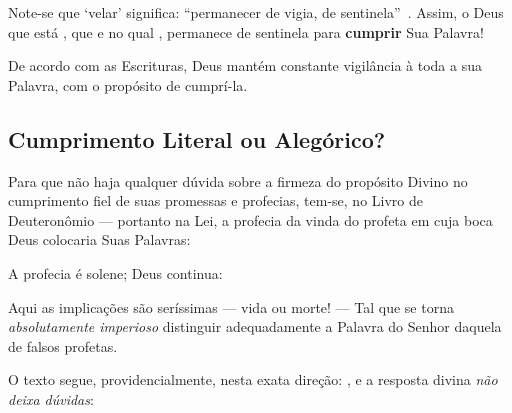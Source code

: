     Note-se que `velar' significa: ``permanecer de vigia, de sentinela''~\cite{2009-Houaiss+Franco-Objetiva}. Assim, o Deus  que
    está ,  que   e no qual , permanece de sentinela para \textbf{cumprir} Sua Palavra!

    \begin{PRI}
        \label{pri.vigilância}
        De acordo com as Escrituras, Deus mantém constante vigilância à toda a  sua  Palavra,  com  o  propósito  de
        cumprí-la.
    \end{PRI}


    \subsection{Cumprimento Literal ou Alegórico?}

    Para que não haja qualquer dúvida sobre a firmeza do propósito Divino no cumprimento fiel de  suas  promessas  e  profecias,
    tem-se, no Livro de Deuteronômio --- portanto na Lei, a profecia da vinda do  profeta  em  cuja  boca  Deus  colocaria  Suas
    Palavras:


    A profecia é solene; Deus continua:


    Aqui as implicações são seríssimas --- vida ou morte!  ---  Tal  que  se  torna  \emph{absolutamente  imperioso}  distinguir
    adequadamente a Palavra do Senhor daquela de falsos profetas.

    O texto segue, providencialmente, nesta exata direção: , e a resposta divina \emph{não deixa dúvidas}:

